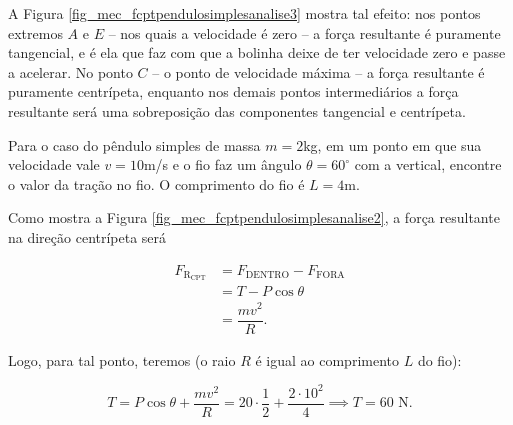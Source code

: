 A Figura \ref{fig_mec_fcptpendulosimplesanalise3} mostra tal efeito: nos pontos extremos $A$ e $E$ -- nos quais a velocidade é zero -- a força resultante é puramente tangencial, e é ela que faz com que a bolinha deixe de ter velocidade zero e passe a acelerar. No ponto $C$ -- o ponto de velocidade máxima -- a força resultante é puramente centrípeta, enquanto nos demais pontos intermediários a força resultante será uma sobreposição das componentes tangencial e centrípeta.





\vspace{0.3cm}

\begin{exemplo}\label{exemplo_newton_frcptex01}

Para o caso do pêndulo simples de massa $m=2$kg, em um ponto em que sua velocidade vale $v=10$m/s e o fio faz um ângulo $\theta=60^\circ$ com a vertical, encontre o valor da tração no fio. O comprimento do fio é $L=4$m.


\resolucao

Como mostra a Figura \ref{fig_mec_fcptpendulosimplesanalise2}, a força resultante na direção centrípeta será

\begin{align}
         F_{\text{R}_\text{CPT}} &= F_{\text{DENTRO}} - F_{\text{FORA}}  \nonumber \\
                                 &= T - P \cos \theta \nonumber \\
                                 &= \dfrac{mv^2}{R}. \nonumber
\end{align}

Logo, para tal ponto, teremos (o raio $R$ é igual ao comprimento $L$ do fio):

$$   T = P \cos \theta + \dfrac{mv^2}{R} = 20 \cdot \dfrac{1}{2}+ \dfrac{2 \cdot 10^2}{4} \implies \boxed{T = 60 \text{ N.}}$$


\end{exemplo}

\vspace{0.3cm}

